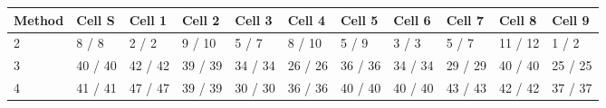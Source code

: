 \begin{tabular}{l l l l l l l l l l l }
\hline
Method & Cell S & Cell 1 & Cell 2 & Cell 3 & Cell 4 & Cell 5 & Cell 6 & Cell 7 & Cell 8 & Cell 9\\
\hline
2      & 8 / 8   & 2 / 2   & 9 / 10  & 5 / 7   & 8 / 10  & 5 / 9   & 3 / 3   & 5 / 7   & 11 / 12 & 1 / 2  \\
3      & 40 / 40 & 42 / 42 & 39 / 39 & 34 / 34 & 26 / 26 & 36 / 36 & 34 / 34 & 29 / 29 & 40 / 40 & 25 / 25\\
4      & 41 / 41 & 47 / 47 & 39 / 39 & 30 / 30 & 36 / 36 & 40 / 40 & 40 / 40 & 43 / 43 & 42 / 42 & 37 / 37\\
\hline
\end{tabular}
